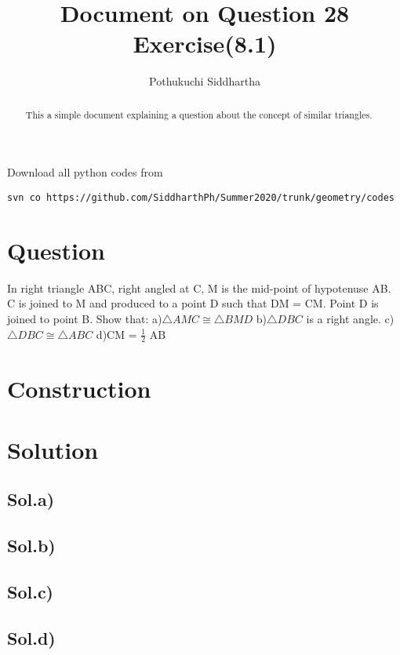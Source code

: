 \documentclass[journal,12pt,twocolumn]{IEEEtran}
\title{Document on Question 28 Exercise(8.1)}
\author{Pothukuchi Siddhartha}
\begin{document}
\maketitle
\begin{abstract}
This a simple document explaining a question about the concept of similar triangles.
\end{abstract}
Download all python codes from 
%


\begin{lstlisting}
svn co https://github.com/SiddharthPh/Summer2020/trunk/geometry/codes
\end{lstlisting}
%

\section*{\textbf{Question}}
In right triangle ABC, right angled at C, M is
the mid-point of hypotenuse AB. C is joined to
M and produced to a point D such that DM =
CM. Point D is joined to point B. Show that:
\newline
a)$\triangle  AMC  \cong   \triangle  BMD $
\newline
b)$\triangle DBC $ is a right angle.
\newline
c)$\triangle  DBC  \cong  \triangle  ABC $
\newline
d)CM = $\frac{1}{2}$ AB

\section*{\textbf{Construction}}

\section*{\textbf{Solution}}

\subsection*{\textbf{Sol.a)}}

\subsection*{\textbf{Sol.b)}}

\subsection*{\textbf{Sol.c)}}

\subsection*{\textbf{Sol.d)}}

\end{document}
